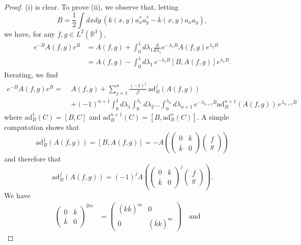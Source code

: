 \documentclass[11pt,a4paper]{article}
\newcommand{\bR}{{\mathbb R}}
\begin{document}
\begin{proof}
(i) is clear. To prove (ii), we observe that, letting 
\[  B = \frac{1}{2} \int dx dy \, \left(k(x,y) a_x^* a_y^* - \overline{k} (x,y) a_x a_y \right) , \]
we have, for any $f,g \in L^2 (\bR^3)$,  
\[ \begin{split} e^{-B} A (f,g) e^{B} & = A (f,g) + \int_0^1 d \lambda_1  \frac{d}{d\lambda_1} e^{-\lambda_1 B} A (f,g) e^{\lambda_1 B}\\
& = A (f,g) - \int_0^1 d \lambda_1  \, e^{-\lambda_1 B} [B,A (f,g)]
e^{\lambda_1 B}.
 \end{split} \]
Iterating, we find
\begin{equation}\label{eq:baker} \begin{split} e^{-B} A (f,g) e^{B} = \; &A (f,g) + \sum_{j=1}^n \frac{(-1)^j}{j!} \,\text{ad}_B^j (A (f,g)) \\ &+(-1)^{n+1}  \int_0^1 d\lambda_1 \int_0^{\lambda_1} d\lambda_2 \dots \int_0^{\lambda_{n}} d\lambda_{n+1} \, e^{-\lambda_{n+1} B}  \text{ad}_B^{n+1} (A (f,g)) \, e^{\lambda_{n+1} B}  \end{split}\end{equation}
where $\text{ad}_B^1 (C) = [B,C]$ and $\text{ad}_B^{n+1}(C) = [B,\text{ad}_B^n(C)]$. A simple computation shows that 
\[  \text{ad}_B^1 (A (f,g)) = [ B, A(f,g)] = - A \left(\left(  \begin{array}{ll}0 &  k  \\ \overline{k} & 0 \end{array} \right) \left( \begin{array}{l} f \\ g \end{array} \right) \right)  \]
and therefore that 
\[ \text{ad}^j_B (A (f,g)) = (-1)^j A  \left(\left(  \begin{array}{ll}0 &  k  \\ \overline{k} & 0 \end{array} \right)^j \left( \begin{array}{l} f \\ g \end{array} \right) \right). \]
We have 
\[ \begin{split} \left(  \begin{array}{ll}0 &  k  \\ \overline{k} & 0 \end{array} \right)^{2m} &= \left(  \begin{array}{ll} (k \overline{k})^m &  0 \\  0  & (\overline{k} k)^m  \end{array} \right)  \quad \text{and } \quad

\end{split}\]
\end{proof}
\end{document}
